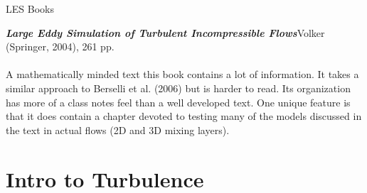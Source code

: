 \begin{frame}{LES Books}

\emph{\textbf{Large Eddy Simulation of Turbulent Incompressible Flows}}\newline Volker (Springer, 2004), 261 pp.
~\\~\\
A mathematically minded text this book contains a lot of information. It takes a similar approach to Berselli et al. (2006) but is harder to read. Its organization has more of a class notes feel than a well developed text. One unique feature is that it does contain a chapter devoted to testing many of the models discussed in the text in actual flows (2D and 3D mixing layers).
\end{frame}

\section{Intro to Turbulence} %

